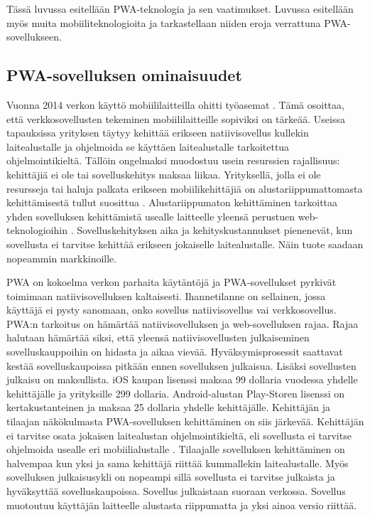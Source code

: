 \documentclass{tktltiki}
\begin{document}
Tässä luvussa esitellään PWA-teknologia ja sen vaatimukset. Luvussa esitellään myös muita mobiiliteknologioita ja tarkastellaan niiden eroja verrattuna  PWA-sovellukseen.

\subsection{PWA-sovelluksen ominaisuudet}

Vuonna 2014 verkon käyttö mobiililaitteilla ohitti työasemat \cite{tandelimpact}. Tämä osoittaa, että verkkosovellusten tekeminen mobiililaitteille sopiviksi on tärkeää. Useissa tapauksissa yrityksen täytyy kehittää erikseen natiivisovellus kullekin laitealustalle ja ohjelmoida se käyttäen laitealustalle tarkoitettua ohjelmointikieltä. Tällöin ongelmaksi muodostuu usein resurssien rajallisuus: kehittäjiä ei ole tai sovelluskehitys maksaa liikaa. Yrityksellä, jolla ei ole resursseja tai haluja palkata erikseen mobiilikehittäjiä on alustariippumattomasta kehittämisestä tullut suosittua \cite{biorn2017progressive}. Alustariippumaton kehittäminen tarkoittaa yhden sovelluksen kehittämistä usealle laitteelle yleensä perustuen web-teknologioihin \cite{heitkotter2013cross}. Sovelluskehityksen aika ja kehityskustannukset pienenevät, kun sovellusta ei tarvitse kehittää erikseen jokaiselle laitealustalle. Näin tuote saadaan nopeammin markkinoille.

PWA on kokoelma verkon parhaita käytäntöjä \cite{Kapoor} ja PWA-sovellukset pyrkivät toimimaan natiivisovelluksen kaltaisesti. Ihannetilanne on sellainen, jossa käyttäjä ei pysty sanomaan, onko sovellus natiivisovellus vai verkkosovellus. PWA:n tarkoitus on hämärtää natiivisovelluksen ja web-sovelluksen rajaa. Rajaa halutaan hämärtää siksi, että yleensä natiivisovellusten julkaiseminen sovelluskauppoihin on hidasta ja aikaa vievää. Hyväksymisprosessit saattavat kestää sovelluskaupoissa pitkään ennen sovelluksen julkaisua. Lisäksi sovellusten julkaisu on maksullista. iOS kaupan lisenssi maksaa 99 dollaria vuodessa yhdelle kehittäjälle ja yrityksille 299 dollaria. Android-alustan Play-Storen lisenssi on kertakustanteinen ja maksaa 25 dollaria yhdelle kehittäjälle. Kehittäjän ja tilaajan näkökulmasta PWA-sovelluksen kehittäminen on siis järkevää. Kehittäjän ei tarvitse osata jokaisen laitealustan ohjelmointikieltä, eli sovellusta ei tarvitse ohjelmoida usealle eri mobiilialustalle \cite{Gazdecki}. Tilaajalle sovelluksen kehittäminen on halvempaa kun yksi ja sama kehittäjä riittää kummallekin laitealustalle. Myös sovelluksen julkaisusykli on nopeampi sillä sovellusta ei tarvitse julkaista ja hyväksyttää sovelluskaupoissa. Sovellus julkaistaan suoraan verkossa. Sovellus muotoutuu käyttäjän laitteelle alustasta riippumatta ja yksi ainoa versio riittää.
\end{document}
